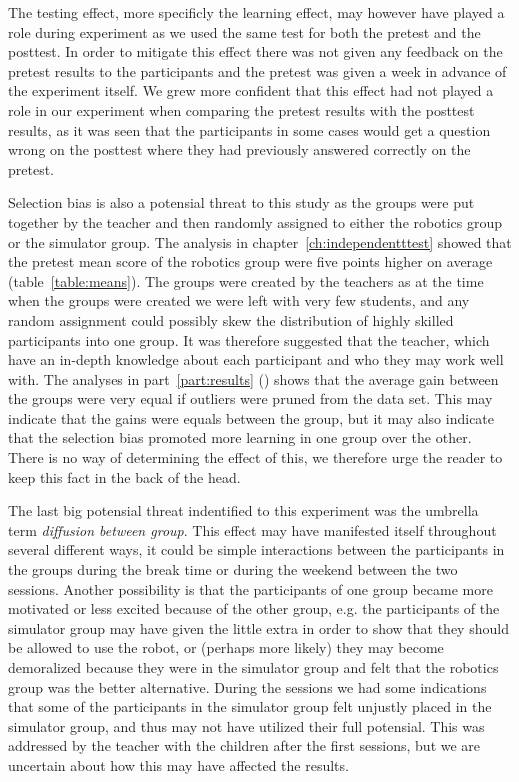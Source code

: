 	\bigskip\noindent
	The testing effect, more specificly the learning effect, may however have played a role during experiment as we used the same test for both the pretest and the posttest. In order to mitigate this effect there was not given any feedback on the pretest results to the participants and the pretest was given a week in advance of the experiment itself. We grew more confident that this effect had not played a role in our experiment when comparing the pretest results with the posttest results, as it was seen that the participants in some cases would get a question wrong on the posttest where they had previously answered correctly on the pretest. 
	
	\bigskip\noindent
	Selection bias is also a potensial threat to this study as the groups were put together by the teacher and then randomly assigned to either the robotics group or the simulator group. The analysis in chapter~\ref{ch:independentttest} showed that the pretest mean score of the robotics group were five points higher on average (table~\ref{table:means}). The groups were created by the teachers as at the time when the groups were created we were left with very few students, and any random assignment could possibly skew the distribution of highly skilled participants into one group. It was therefore suggested that the teacher, which have an in-depth knowledge about each participant and who they may work well with. The analyses in part~\ref{part:results} () shows that the average gain between the groups were very equal if outliers were pruned from the data set. This may indicate that the gains were equals between the group, but it may also indicate that the selection bias promoted more learning in one group over the other. There is no way of determining the effect of this, we therefore urge the reader to keep this fact in the back of the head. 
	
	\bigskip\noindent
	The last big potensial threat indentified to this experiment was the umbrella term \textit{diffusion between group}. This effect may have manifested itself throughout several different ways, it could be simple interactions between the participants in the groups during the break time or during the weekend between the two sessions. Another possibility is that the participants of one group became more motivated or less excited because of the other group, e.g. the participants of the simulator group may have given the little extra in order to show that they should be allowed to use the robot, or (perhaps more likely) they may become demoralized because they were in the simulator group and felt that the robotics group was the better alternative.
	During the sessions we had some indications that some of the participants in the simulator group felt unjustly placed in the simulator group, and thus may not have utilized their full potensial. 
	This was addressed by the teacher with the children after the first sessions, but we are uncertain about how this may have affected the results. 